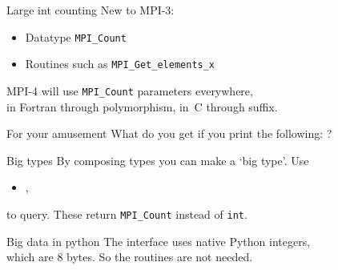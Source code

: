 
\begin{numberedframe}{Large int counting}
  New to MPI-3: 
  \begin{itemize}
  \item Datatype \lstinline{MPI_Count}
  \item Routines such as \lstinline{MPI_Get_elements_x}
  \end{itemize}

  MPI-4 will use \lstinline{MPI_Count} parameters everywhere,\\
  in Fortran through polymorphism, in~C through  suffix.
\end{numberedframe}


\begin{numberedframe}{For your amusement}
What do you get if you print the following:
?
\end{numberedframe}

\begin{numberedframe}{Big types}
  By composing types you can make a `big type'. Use
  \begin{itemize}
  \item {},
  \end{itemize}
  to query.
  These return \lstinline{MPI_Count} instead of \lstinline{int}.
\end{numberedframe}

\begin{numberedframe}{Big data in python}
  The  interface uses native Python integers,\\
  which are 8 bytes. So the  routines are not needed.
\end{numberedframe}

\endinput

\begin{numberedframe}{}
\begin{lstlisting}
\end{lstlisting}
\end{numberedframe}

